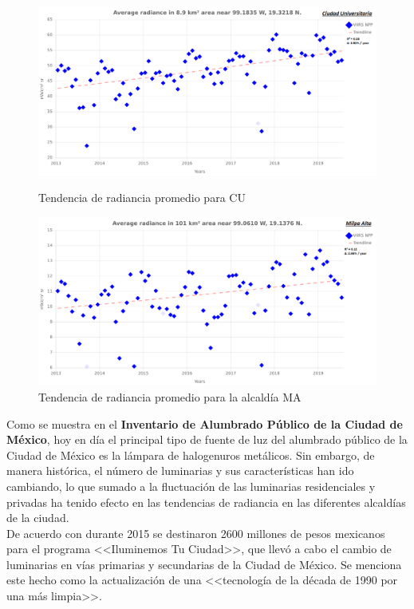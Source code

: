 \newpage


\begin{figure}[H]
  \centering
    \includegraphics[width=1\textwidth]{CU}
  \caption{Tendencia de radiancia promedio para CU}
  \label{radiancetrendscu}
\vspace{20mm} 
    \includegraphics[width=1\textwidth]{MA}
  \caption{Tendencia de radiancia promedio para la alcaldía MA}
  \label{radiancetrendsma}
\end{figure}
\blindtext

\newpage

Como se muestra en el \textbf{Inventario de Alumbrado Público de la Ciudad de México}, hoy en día el principal tipo de fuente de luz del alumbrado público de la Ciudad de México es la lámpara de halogenuros metálicos. Sin embargo, de manera histórica, el número de luminarias y sus características han ido cambiando, lo que sumado a la fluctuación de  las luminarias residenciales y privadas ha tenido efecto en las tendencias de radiancia en las diferentes alcaldías de la ciudad.\\

De acuerdo con \cite{Universal2017} durante 2015 se destinaron 2600 millones de pesos mexicanos para el programa <<Iluminemos Tu Ciudad>>, que llevó a cabo el cambio de luminarias en vías primarias y secundarias de la Ciudad de México. Se menciona este hecho como la actualización de una <<tecnología de la década de 1990 por una más limpia>>.\\

